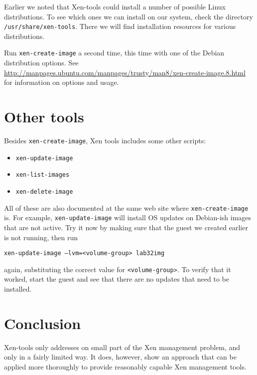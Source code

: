 \documentclass{article}
\begin{document}
Earlier we noted that Xen-tools could install a number of possible Linux distributions. To see which ones we can install on our system, check the directory \texttt{/usr/share/xen-tools}. There we will find installation resources for various 
distributions.

Run \texttt{xen-create-image} a second time, this time with one of the Debian distribution options. See 
\url{http://manpages.ubuntu.com/manpages/trusty/man8/xen-create-image.8.html} for information on 
options and usage.

\section{Other tools}
Besides \texttt{xen-create-image}, Xen tools includes some other scripts:

\begin{itemize}
  \item \texttt{xen-update-image}
  \item \texttt{xen-list-images}
  \item \texttt{xen-delete-image}
 \end{itemize}
 
 All of these are also documented at the same web site where \texttt{xen-create-image} is. For example, 
 \texttt{xen-update-image} will install OS updates on Debian-ish images that are not active. Try it now by 
 making sure that the guest we created earlier is not running, then run
 
 \texttt{xen-update-image --lvm=<volume-group> lab32img}
 
 again, substituting the correct value for \texttt{<volume-group>}. To verify that it worked, start the guest and see 
 that there are no updates that need to be installed.
 
 \section{Conclusion}
 Xen-tools only addresses on small part of the Xen management problem, and only in a fairly limited way. It does, however, show an approach that can be applied more thoroughly to provide reasonably capable Xen management tools.
 
 
\end{document}

